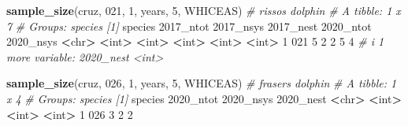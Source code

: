 \documentclass[
]{book}
\newenvironment{Shaded}{\begin{snugshade}}{\end{snugshade}}
\newcommand{\AttributeTok}[1]{\textcolor[rgb]{0.13,0.29,0.53}{#1}}
\newcommand{\CommentTok}[1]{\textcolor[rgb]{0.56,0.35,0.01}{\textit{#1}}}
\newcommand{\DecValTok}[1]{\textcolor[rgb]{0.00,0.00,0.81}{#1}}
\newcommand{\ErrorTok}[1]{\textcolor[rgb]{0.64,0.00,0.00}{\textbf{#1}}}
\newcommand{\FunctionTok}[1]{\textcolor[rgb]{0.13,0.29,0.53}{\textbf{#1}}}
\newcommand{\NormalTok}[1]{#1}
\newcommand{\SpecialCharTok}[1]{\textcolor[rgb]{0.81,0.36,0.00}{\textbf{#1}}}
\newcommand{\StringTok}[1]{\textcolor[rgb]{0.31,0.60,0.02}{#1}}
\begin{document}
\begin{Shaded}
\begin{Highlighting}[]
\FunctionTok{sample\_size}\NormalTok{(cruz, }\StringTok{\textquotesingle{}021\textquotesingle{}}\NormalTok{, }\DecValTok{1}\NormalTok{, years, }\DecValTok{5}\NormalTok{, }\StringTok{\textquotesingle{}WHICEAS\textquotesingle{}}\NormalTok{) }\CommentTok{\# risso\textquotesingle{}s dolphin}
\CommentTok{\# A tibble: 1 x 7}
\CommentTok{\# Groups:   species [1]}
\NormalTok{  species }\StringTok{\textasciigrave{}}\AttributeTok{2017\_ntot}\StringTok{\textasciigrave{}} \StringTok{\textasciigrave{}}\AttributeTok{2017\_nsys}\StringTok{\textasciigrave{}} \StringTok{\textasciigrave{}}\AttributeTok{2017\_nest}\StringTok{\textasciigrave{}} \StringTok{\textasciigrave{}}\AttributeTok{2020\_ntot}\StringTok{\textasciigrave{}} \StringTok{\textasciigrave{}}\AttributeTok{2020\_nsys}\StringTok{\textasciigrave{}}
  \SpecialCharTok{\textless{}}\NormalTok{chr}\SpecialCharTok{\textgreater{}}         \ErrorTok{\textless{}}\NormalTok{int}\SpecialCharTok{\textgreater{}}       \ErrorTok{\textless{}}\NormalTok{int}\SpecialCharTok{\textgreater{}}       \ErrorTok{\textless{}}\NormalTok{int}\SpecialCharTok{\textgreater{}}       \ErrorTok{\textless{}}\NormalTok{int}\SpecialCharTok{\textgreater{}}       \ErrorTok{\textless{}}\NormalTok{int}\SpecialCharTok{\textgreater{}}
\DecValTok{1} \DecValTok{021}               \DecValTok{5}           \DecValTok{2}           \DecValTok{2}           \DecValTok{5}           \DecValTok{4}
\CommentTok{\# i 1 more variable: \textasciigrave{}2020\_nest\textasciigrave{} \textless{}int\textgreater{}}

\FunctionTok{sample\_size}\NormalTok{(cruz, }\StringTok{\textquotesingle{}026\textquotesingle{}}\NormalTok{, }\DecValTok{1}\NormalTok{, years, }\DecValTok{5}\NormalTok{, }\StringTok{\textquotesingle{}WHICEAS\textquotesingle{}}\NormalTok{) }\CommentTok{\# fraser\textquotesingle{}s dolphin}
\CommentTok{\# A tibble: 1 x 4}
\CommentTok{\# Groups:   species [1]}
\NormalTok{  species }\StringTok{\textasciigrave{}}\AttributeTok{2020\_ntot}\StringTok{\textasciigrave{}} \StringTok{\textasciigrave{}}\AttributeTok{2020\_nsys}\StringTok{\textasciigrave{}} \StringTok{\textasciigrave{}}\AttributeTok{2020\_nest}\StringTok{\textasciigrave{}}
  \SpecialCharTok{\textless{}}\NormalTok{chr}\SpecialCharTok{\textgreater{}}         \ErrorTok{\textless{}}\NormalTok{int}\SpecialCharTok{\textgreater{}}       \ErrorTok{\textless{}}\NormalTok{int}\SpecialCharTok{\textgreater{}}       \ErrorTok{\textless{}}\NormalTok{int}\SpecialCharTok{\textgreater{}}
\DecValTok{1} \DecValTok{026}               \DecValTok{3}           \DecValTok{2}           \DecValTok{2}


\end{Highlighting}
\end{Shaded}
\end{document}
